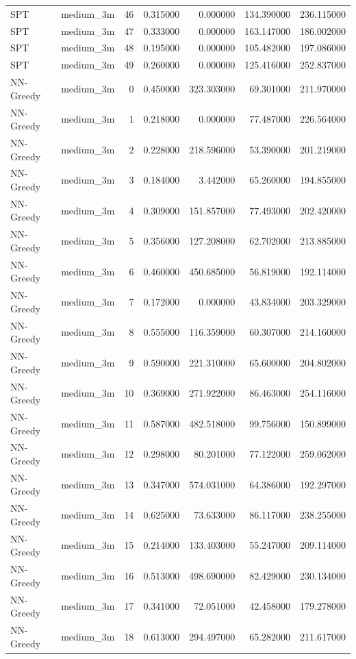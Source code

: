 \begin{tabular}{llrrrrr}
SPT & medium_3m & 46 & 0.315000 & 0.000000 & 134.390000 & 236.115000 \\
SPT & medium_3m & 47 & 0.333000 & 0.000000 & 163.147000 & 186.002000 \\
SPT & medium_3m & 48 & 0.195000 & 0.000000 & 105.482000 & 197.086000 \\
SPT & medium_3m & 49 & 0.260000 & 0.000000 & 125.416000 & 252.837000 \\
NN-Greedy & medium_3m & 0 & 0.450000 & 323.303000 & 69.301000 & 211.970000 \\
NN-Greedy & medium_3m & 1 & 0.218000 & 0.000000 & 77.487000 & 226.564000 \\
NN-Greedy & medium_3m & 2 & 0.228000 & 218.596000 & 53.390000 & 201.219000 \\
NN-Greedy & medium_3m & 3 & 0.184000 & 3.442000 & 65.260000 & 194.855000 \\
NN-Greedy & medium_3m & 4 & 0.309000 & 151.857000 & 77.493000 & 202.420000 \\
NN-Greedy & medium_3m & 5 & 0.356000 & 127.208000 & 62.702000 & 213.885000 \\
NN-Greedy & medium_3m & 6 & 0.460000 & 450.685000 & 56.819000 & 192.114000 \\
NN-Greedy & medium_3m & 7 & 0.172000 & 0.000000 & 43.834000 & 203.329000 \\
NN-Greedy & medium_3m & 8 & 0.555000 & 116.359000 & 60.307000 & 214.160000 \\
NN-Greedy & medium_3m & 9 & 0.590000 & 221.310000 & 65.600000 & 204.802000 \\
NN-Greedy & medium_3m & 10 & 0.369000 & 271.922000 & 86.463000 & 254.116000 \\
NN-Greedy & medium_3m & 11 & 0.587000 & 482.518000 & 99.756000 & 150.899000 \\
NN-Greedy & medium_3m & 12 & 0.298000 & 80.201000 & 77.122000 & 259.062000 \\
NN-Greedy & medium_3m & 13 & 0.347000 & 574.031000 & 64.386000 & 192.297000 \\
NN-Greedy & medium_3m & 14 & 0.625000 & 73.633000 & 86.117000 & 238.255000 \\
NN-Greedy & medium_3m & 15 & 0.214000 & 133.403000 & 55.247000 & 209.114000 \\
NN-Greedy & medium_3m & 16 & 0.513000 & 498.690000 & 82.429000 & 230.134000 \\
NN-Greedy & medium_3m & 17 & 0.341000 & 72.051000 & 42.458000 & 179.278000 \\
NN-Greedy & medium_3m & 18 & 0.613000 & 294.497000 & 65.282000 & 211.617000 \\

\end{tabular}
